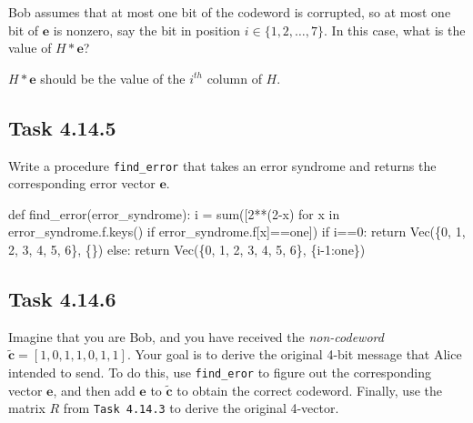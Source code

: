 \documentclass[
  letterpaper,
  DIV=11,
  numbers=noendperiod]{scrartcl}
\newenvironment{Shaded}{\begin{snugshade}}{\end{snugshade}}
\newcommand{\BuiltInTok}[1]{\textcolor[rgb]{0.00,0.23,0.31}{#1}}
\newcommand{\ControlFlowTok}[1]{\textcolor[rgb]{0.00,0.23,0.31}{#1}}
\newcommand{\DecValTok}[1]{\textcolor[rgb]{0.68,0.00,0.00}{#1}}
\newcommand{\KeywordTok}[1]{\textcolor[rgb]{0.00,0.23,0.31}{#1}}
\newcommand{\NormalTok}[1]{\textcolor[rgb]{0.00,0.23,0.31}{#1}}
\newcommand{\OperatorTok}[1]{\textcolor[rgb]{0.37,0.37,0.37}{#1}}
\begin{document}
Bob assumes that at most one bit of the codeword is corrupted, so at
most one bit of \(\bm{e}\) is nonzero, say the bit in position
\(i \in \{1, 2, \dots, 7\}\). In this case, what is the value of
\(H * \bm{e}\)?

\(H * \bm{e}\) should be the value of the \(i^{th}\) column of \(H\).

\hypertarget{task-4.14.5}{%
\subsection{Task 4.14.5}\label{task-4.14.5}}

Write a procedure \texttt{find\_error} that takes an error syndrome and
returns the corresponding error vector \(\bm{e}\).

\begin{Shaded}
\begin{Highlighting}[numbers=left,,]
\KeywordTok{def}\NormalTok{ find\_error(error\_syndrome):}
\NormalTok{  i }\OperatorTok{=} \BuiltInTok{sum}\NormalTok{([}\DecValTok{2}\OperatorTok{**}\NormalTok{(}\DecValTok{2}\OperatorTok{{-}}\NormalTok{x) }\ControlFlowTok{for}\NormalTok{ x }\KeywordTok{in}\NormalTok{ error\_syndrome.f.keys() }\ControlFlowTok{if}\NormalTok{ error\_syndrome.f[x]}\OperatorTok{==}\NormalTok{one])}
  \ControlFlowTok{if}\NormalTok{ i}\OperatorTok{==}\DecValTok{0}\NormalTok{:}
    \ControlFlowTok{return}\NormalTok{ Vec(\{}\DecValTok{0}\NormalTok{, }\DecValTok{1}\NormalTok{, }\DecValTok{2}\NormalTok{, }\DecValTok{3}\NormalTok{, }\DecValTok{4}\NormalTok{, }\DecValTok{5}\NormalTok{, }\DecValTok{6}\NormalTok{\}, \{\})}
  \ControlFlowTok{else}\NormalTok{:}
    \ControlFlowTok{return}\NormalTok{ Vec(\{}\DecValTok{0}\NormalTok{, }\DecValTok{1}\NormalTok{, }\DecValTok{2}\NormalTok{, }\DecValTok{3}\NormalTok{, }\DecValTok{4}\NormalTok{, }\DecValTok{5}\NormalTok{, }\DecValTok{6}\NormalTok{\}, \{i}\OperatorTok{{-}}\DecValTok{1}\NormalTok{:one\})}
\end{Highlighting}
\end{Shaded}

\hypertarget{task-4.14.6}{%
\subsection{Task 4.14.6}\label{task-4.14.6}}

Imagine that you are Bob, and you have received the \emph{non-codeword}
\(\bm{\tilde{c}} = [1, 0, 1, 1, 0, 1, 1]\). Your goal is to derive the
original 4-bit message that Alice intended to send. To do this, use
\texttt{find\_eror} to figure out the corresponding vector \(\bm{e}\),
and then add \(\bm{e}\) to \(\bm{\tilde{c}}\) to obtain the correct
codeword. Finally, use the matrix \(R\) from \texttt{Task\ 4.14.3} to
derive the original 4-vector.
\end{document}

